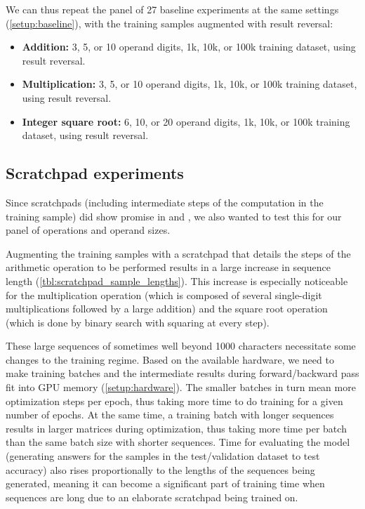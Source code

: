 We can thus repeat the panel of 27 baseline experiments at the same settings (\cref{setup:baseline}), with the training samples augmented with result reversal:


\begin{itemize}
	\item \textbf{Addition:} 3, 5, or 10 operand digits, 1k, 10k, or 100k training dataset, using result reversal.
	\item \textbf{Multiplication:} 3, 5, or 10 operand digits, 1k, 10k, or 100k training dataset, using result reversal.
	\item \textbf{Integer square root:} 6, 10, or 20 operand digits, 1k, 10k, or 100k training dataset, using result reversal.
\end{itemize}

\subsection{Scratchpad experiments}
\label{setup:scratchpad}

Since scratchpads (including intermediate steps of the computation in the training sample) did show promise in \cite{teaching} and \cite{goat}, we also wanted to test this for our panel of operations and operand sizes.

Augmenting the training samples with a scratchpad that details the steps of the arithmetic operation to be performed results in a large increase in sequence length (\cref{tbl:scratchpad_sample_lengths}). This increase is especially noticeable for the multiplication operation (which is composed of several single-digit multiplications followed by a large addition) and the square root operation (which is done by binary search with squaring at every step).

These large sequences of sometimes well beyond 1000 characters necessitate some changes to the training regime. Based on the available hardware, we need to make training batches and the intermediate results during forward/backward pass fit into GPU memory (\cref{setup:hardware}). The smaller batches in turn mean more optimization steps per epoch, thus taking more time to do training for a given number of epochs. At the same time, a training batch with longer sequences results in larger matrices during optimization, thus taking more time per batch than the same batch size with shorter sequences.
Time for evaluating the model (generating answers for the samples in the test/validation dataset to test accuracy) also rises proportionally to the lengths of the sequences being generated, meaning it can become a significant part of training time when sequences are long due to an elaborate scratchpad being trained on.

